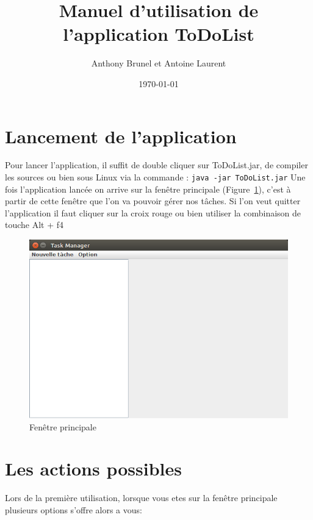 \documentclass{article}
\title{Manuel d'utilisation de l'application ToDoList}
\author{Anthony Brunel et Antoine Laurent}
\date{\today}
\begin{document}
\maketitle
\newpage

\section{Lancement de l'application}
Pour lancer l'application, il suffit de double cliquer sur ToDoList.jar, de compiler les sources ou bien sous Linux via la commande : \verb+java -jar ToDoList.jar+
\newline
\newline
Une fois l'application lancée on arrive sur la fenêtre principale (Figure~\ref{Fenêtre principale}), c'est à partir de cette fenêtre que l'on va pouvoir gérer nos tâches. 
\newline
Si l'on veut quitter l'application il faut cliquer sur la croix rouge ou bien utiliser la combinaison de touche Alt + f4

\begin{figure}[h]
	\centering
	\includegraphics[scale=0.34]{images/MainDIsplay.png}
	\caption{Fenêtre principale}
	\label{Fenêtre principale}
\end{figure}

\section{Les actions possibles}
Lors de la première utilisation, lorsque vous etes sur la fenêtre principale plusieurs options s'offre alors a vous:
\newline
\end{document}
